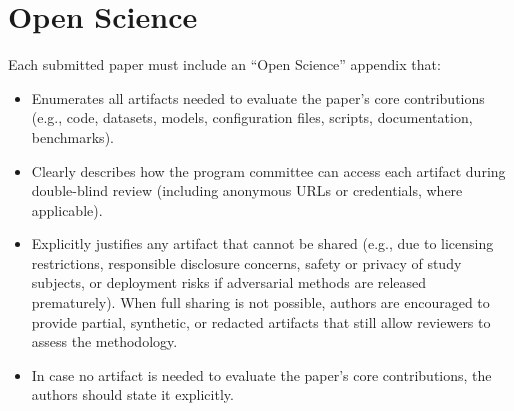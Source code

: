 \documentclass[sigconf]{acmart}
\theoremstyle{definition}
\begin{document}



\appendix

\section{Open Science}
Each submitted paper must include an “Open Science” appendix that:
\begin{itemize}
\item Enumerates all artifacts needed to evaluate the paper’s core contributions (e.g., code, datasets, models, configuration files, scripts, documentation, benchmarks).
\item Clearly describes how the program committee can access each artifact during double-blind review (including anonymous URLs or credentials, where applicable).
\item Explicitly justifies any artifact that cannot be shared (e.g., due to licensing restrictions, responsible disclosure concerns, safety or privacy of study subjects, or deployment risks if adversarial methods are released prematurely). When full sharing is not possible, authors are encouraged to provide partial, synthetic, or redacted artifacts that still allow reviewers to assess the methodology.
\item In case no artifact is needed to evaluate the paper’s core contributions, the authors should state it explicitly.
\end{itemize}
\end{document}
